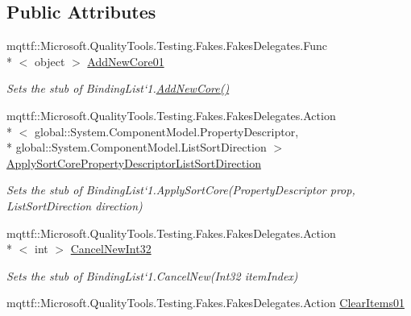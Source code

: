 \subsection*{Public Attributes}
\begin{DoxyCompactItemize}
\item 
mqttf\-::\-Microsoft.\-Quality\-Tools.\-Testing.\-Fakes.\-Fakes\-Delegates.\-Func\\*
$<$ object $>$ \hyperlink{class_system_1_1_component_model_1_1_fakes_1_1_stub_binding_list_3_01_t_01_4_aa45697ca24d77db9cc8659ca392917d7}{Add\-New\-Core01}
\begin{DoxyCompactList}\small\item\em Sets the stub of Binding\-List`1.\hyperlink{class_system_1_1_component_model_1_1_fakes_1_1_stub_binding_list_3_01_t_01_4_a6338d7a3b80c7fa1de5a3d4620a6b96b}{Add\-New\-Core()}\end{DoxyCompactList}\item 
mqttf\-::\-Microsoft.\-Quality\-Tools.\-Testing.\-Fakes.\-Fakes\-Delegates.\-Action\\*
$<$ global\-::\-System.\-Component\-Model.\-Property\-Descriptor, \\*
global\-::\-System.\-Component\-Model.\-List\-Sort\-Direction $>$ \hyperlink{class_system_1_1_component_model_1_1_fakes_1_1_stub_binding_list_3_01_t_01_4_ad7c3e4ba6cf45990ec8dbf02ca80065e}{Apply\-Sort\-Core\-Property\-Descriptor\-List\-Sort\-Direction}
\begin{DoxyCompactList}\small\item\em Sets the stub of Binding\-List`1.Apply\-Sort\-Core(\-Property\-Descriptor prop, List\-Sort\-Direction direction)\end{DoxyCompactList}\item 
mqttf\-::\-Microsoft.\-Quality\-Tools.\-Testing.\-Fakes.\-Fakes\-Delegates.\-Action\\*
$<$ int $>$ \hyperlink{class_system_1_1_component_model_1_1_fakes_1_1_stub_binding_list_3_01_t_01_4_a90c38bfaeaf0aec93732c0e017b95143}{Cancel\-New\-Int32}
\begin{DoxyCompactList}\small\item\em Sets the stub of Binding\-List`1.Cancel\-New(\-Int32 item\-Index)\end{DoxyCompactList}\item 
mqttf\-::\-Microsoft.\-Quality\-Tools.\-Testing.\-Fakes.\-Fakes\-Delegates.\-Action \hyperlink{class_system_1_1_component_model_1_1_fakes_1_1_stub_binding_list_3_01_t_01_4_aafb325890664b503f57d79747a12e8d8}{Clear\-Items01}

\end{DoxyCompactItemize}
